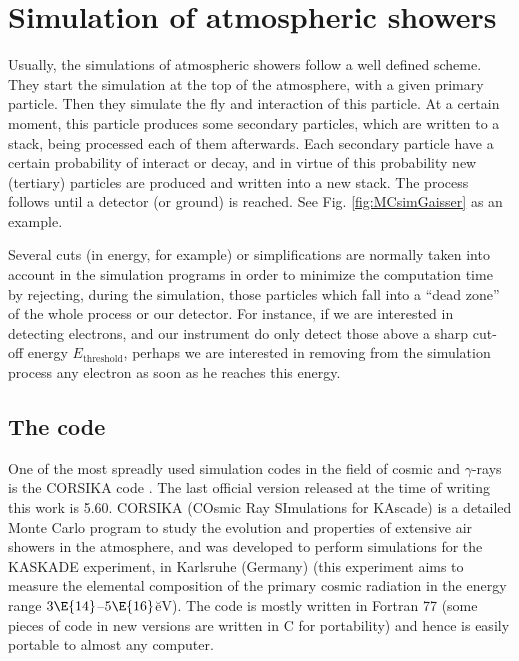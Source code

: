 
\chapter{Simulation of atmospheric showers}
\label{chapter:simshowers}

Usually, the \MC simulations of atmospheric showers follow a well
defined scheme. They start the simulation at the top of the
atmosphere, with a given primary particle. Then they simulate the fly
and interaction of this particle. At a certain moment, this particle
produces some secondary particles, which are written to a stack, being
processed each of them afterwards. Each secondary particle have a
certain probability of interact or decay, and in virtue of this
probability new (tertiary) particles are produced and written into a
new stack. The process follows until a detector (or ground) is
reached. See Fig. \ref{fig:MCsimGaisser} as an example.

\mcsimsample

Several cuts (in energy, for example) or simplifications are normally
taken into account in the simulation programs in order to minimize the
computation time by rejecting, during the simulation, those particles
which fall into a ``dead zone'' of the whole process or our detector.
For instance, if we are interested in detecting electrons, and our
instrument do only detect those above a sharp cut-off energy
$E_{\mathrm{threshold}}$, perhaps we are interested in removing from
the simulation process any electron as soon as he reaches this energy.

\section{The \CORSIKA code}
\label{sec:CORSIKA}
%
One of the most spreadly used simulation codes in the field of cosmic
and $\gamma$-rays is the CORSIKA code \cite{CORSIKA:manual}. The last
official version released at the time of writing this work is 5.60.
CORSIKA (COsmic Ray SImulations for KAscade) is a detailed Monte Carlo
program to study the evolution and properties of extensive air showers
in the atmosphere, and was developed to perform simulations for the
KASKADE experiment, in Karlsruhe (Germany) \cite{KASKADE} (this
experiment aims to measure the elemental composition of the primary
cosmic radiation in the energy range $3\E{14}$--$5\E{16}$\u{eV}). The
code is mostly written in Fortran 77 (some pieces of code in new
versions are written in C for portability) and hence is easily portable
to almost any computer.

